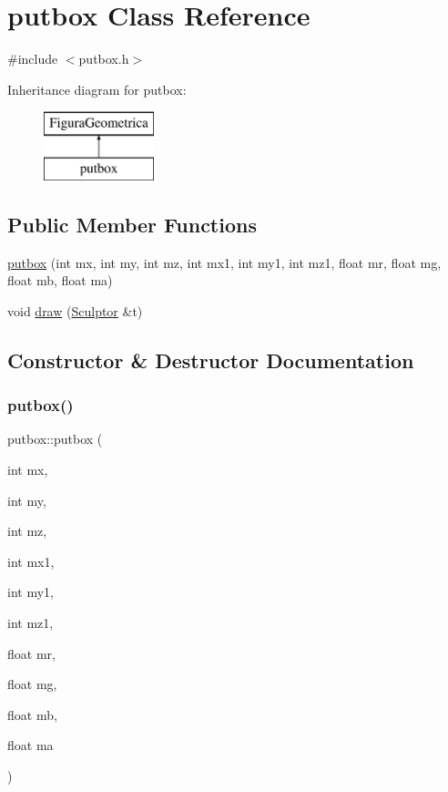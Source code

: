 \hypertarget{classputbox}{}\section{putbox Class Reference}
\label{classputbox}


{\ttfamily \#include $<$putbox.\+h$>$}

Inheritance diagram for putbox\+:\begin{figure}[H]
\begin{center}
\leavevmode
\includegraphics[height=2.000000cm]{classputbox}
\end{center}
\end{figure}
\subsection*{Public Member Functions}
\begin{DoxyCompactItemize}
\item 
\mbox{\hyperlink{classputbox_a882d720a1fdcc7a50b64e045baa24fd5}{putbox}} (int mx, int my, int mz, int mx1, int my1, int mz1, float mr, float mg, float mb, float ma)
\item 
void \mbox{\hyperlink{classputbox_a1c330a31b906efd7b0fcfa0efb6f06ef}{draw}} (\mbox{\hyperlink{class_sculptor}{Sculptor}} \&t)
\end{DoxyCompactItemize}


\subsection{Constructor \& Destructor Documentation}
\mbox{\label{classputbox_a882d720a1fdcc7a50b64e045baa24fd5}} 
\subsubsection{\texorpdfstring{putbox()}{putbox()}}
{\footnotesize\ttfamily putbox\+::putbox (\begin{DoxyParamCaption}\item[{int}]{mx,  }\item[{int}]{my,  }\item[{int}]{mz,  }\item[{int}]{mx1,  }\item[{int}]{my1,  }\item[{int}]{mz1,  }\item[{float}]{mr,  }\item[{float}]{mg,  }\item[{float}]{mb,  }\item[{float}]{ma }\end{DoxyParamCaption})}



